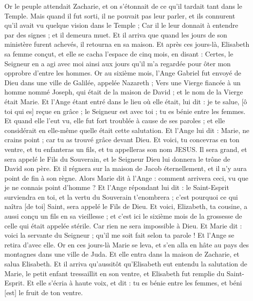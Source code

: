 \begin{multicols}{2}
Or le peuple attendait Zacharie, et on s'étonnait de ce qu'il tardait tant dans le Temple.
Mais quand il fut sorti, il ne pouvait pas leur parler, et ils connurent qu'il avait vu quelque vision dans le Temple ; Car il le leur donnait à entendre par des signes ; et il demeura muet.
Et il arriva que quand les jours de son ministère furent achevés, il retourna en sa maison.
Et après ces jours-là, Elisabeth sa femme conçut, et elle se cacha l'espace de cinq mois, en disant :
Certes, le Seigneur en a agi avec moi ainsi aux jours qu'il m'a regardée pour ôter mon opprobre d'entre les hommes.
Or au sixième mois, l'Ange Gabriel fut envoyé de Dieu dans une ville de Galilée, appelée Nazareth ;
Vers une Vierge fiancée à un homme nommé Joseph, qui était de la maison de David ; et le nom de la Vierge était Marie.
Et l'Ange étant entré dans le lieu où elle était, lui dit : je te salue, [ô toi qui es] reçue en grâce ; le Seigneur est avec toi ; tu es bénie entre les femmes.
Et quand elle l'eut vu, elle fut fort troublée à cause de ses paroles ; et elle considérait en elle-même quelle était cette salutation.
Et l'Ange lui dit : Marie, ne crains point ; car tu as trouvé grâce devant Dieu.
Et voici, tu concevras en ton ventre, et tu enfanteras un fils, et tu appelleras son nom JESUS.
Il sera grand, et sera appelé le Fils du Souverain, et le Seigneur Dieu lui donnera le trône de David son père.
Et il régnera sur la maison de Jacob éternellement, et il n'y aura point de fin à son règne.
Alors Marie dit à l'Ange : comment arrivera ceci, vu que je ne connais point d'homme ?
Et l'Ange répondant lui dit : le Saint-Esprit surviendra en toi, et la vertu du Souverain t'enombrera ; c'est pourquoi ce qui naîtra [de toi] Saint, sera appelé le Fils de Dieu.
Et voici, Elizabeth, ta cousine, a aussi conçu un fils en sa vieillesse ; et c'est ici le sixième mois de la grossesse de celle qui était appelée stérile.
Car rien ne sera impossible à Dieu.
Et Marie dit : voici la servante du Seigneur ; qu'il me soit fait selon ta parole ! Et l'Ange se retira d'avec elle.
Or en ces jours-là Marie se leva, et s'en alla en hâte au pays des montagnes dans une ville de Juda.
Et elle entra dans la maison de Zacharie, et salua Elisabeth.
Et il arriva qu'aussitôt qu'Elisabeth eut entendu la salutation de Marie, le petit enfant tressaillit en son ventre, et Elisabeth fut remplie du Saint-Esprit.
Et elle s'écria à haute voix, et dit : tu es bénie entre les femmes, et béni [est] le fruit de ton ventre.

\end{multicols}
